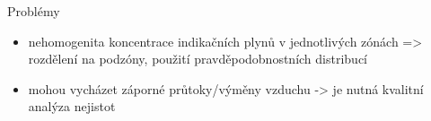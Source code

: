 \documentclass[10pt]{beamer}
\begin{document}
\begin{frame}{Problémy}
    \small
    \begin{itemize}
        \item nehomogenita koncentrace indikačních plynů v jednotlivých zónách => rozdělení na podzóny, použití pravděpodobnostních distribucí
        \item mohou vycházet záporné průtoky/výměny vzduchu -> je nutná kvalitní analýza nejistot
    \end{itemize}
\end{frame}



\begin{frame}[allowframebreaks]
    \nocite{*}
\renewcommand*{\bibfont}{\tiny}
\printbibliography
\end{frame}
\end{document}
